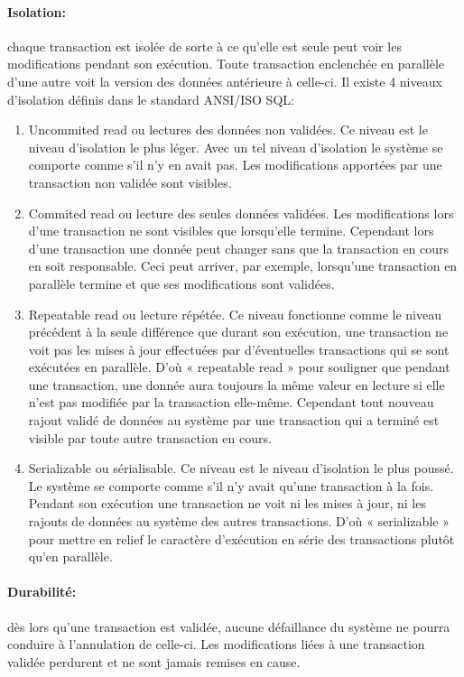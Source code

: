 \paragraph{Isolation:} chaque transaction est isolée de sorte à ce qu'elle est 
seule peut voir les modifications pendant son exécution. Toute
transaction enclenchée en parallèle d'une autre voit la version des
données antérieure à celle-ci.  Il existe 4 niveaux d'isolation
définis dans le standard \textsf{ANSI/ISO SQL}:
\begin{enumerate}
\item \textsf{Uncommited read ou lectures des données non validées}.
  Ce niveau est le niveau d'isolation le plus léger. Avec un tel
  niveau d'isolation le système se comporte comme s'il n'y en avait
  pas. Les modifications apportées par une transaction non validée
  sont visibles.

\item \textsf{Commited read ou lecture des seules données
  validées}. Les modifications lors d'une transaction ne sont visibles
  que lorsqu'elle termine.  Cependant lors d'une transaction une
  donnée peut changer sans que la transaction en cours en soit
  responsable. Ceci peut arriver, par exemple, lorsqu'une transaction
  en parallèle termine et que ses modifications sont validées.

\item \textsf{Repeatable read ou lecture répétée}. Ce niveau
  fonctionne comme le niveau précédent à la seule différence que
  durant son exécution, une transaction ne voit pas les mises à jour
  effectuées par d'éventuelles transactions qui se sont exécutées en
  parallèle. D'où « \textsf{repeatable read} » pour souligner que pendant une
  transaction, une donnée aura toujours la même valeur en
  lecture si elle n'est pas modifiée par la transaction elle-même.
  Cependant tout nouveau rajout validé de données au système par une
  transaction qui a terminé est visible par toute autre transaction en
  cours.

\item \textsf{Serializable ou sérialisable}. Ce niveau est le niveau
  d'isolation le plus poussé. Le système se comporte comme s'il n'y
  avait qu'une transaction à la fois. Pendant son exécution une
  transaction ne voit ni les mises à jour, ni les rajouts de données
  au système des autres transactions. D'où « \textsf{serializable} » pour
  mettre en relief le caractère d'exécution en série des transactions
  plutôt qu'en parallèle.
\end{enumerate}

\paragraph{Durabilité:} dès lors qu'une transaction est validée, aucune défaillance
du système ne pourra conduire à l'annulation de celle-ci. Les modifications liées à
une transaction validée perdurent et ne sont jamais remises en cause.
